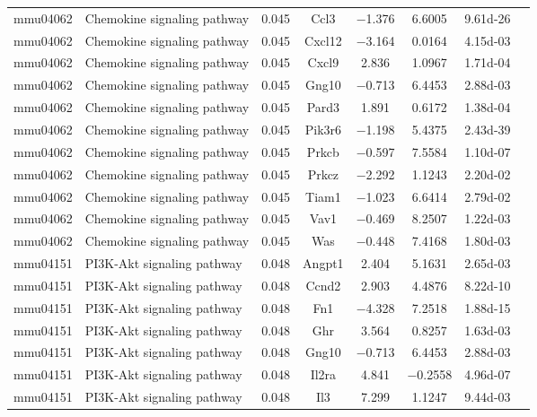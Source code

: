 {\begin{longtable}[l]{cp{4.3cm}cccccc}
mmu04062	& Chemokine signaling pathway	& \num{0.045}	& Ccl3	& \num{-1.376}	& \num{ 6.6005}	& \num{9.61d-26}\\ 
mmu04062	& Chemokine signaling pathway	& \num{0.045}	& Cxcl12	& \num{-3.164}	& \num{ 0.0164}	& \num{4.15d-03}\\ 
mmu04062	& Chemokine signaling pathway	& \num{0.045}	& Cxcl9	& \num{ 2.836}	& \num{ 1.0967}	& \num{1.71d-04}\\ 
mmu04062	& Chemokine signaling pathway	& \num{0.045}	& Gng10	& \num{-0.713}	& \num{ 6.4453}	& \num{2.88d-03}\\ 
mmu04062	& Chemokine signaling pathway	& \num{0.045}	& Pard3	& \num{ 1.891}	& \num{ 0.6172}	& \num{1.38d-04}\\ 
mmu04062	& Chemokine signaling pathway	& \num{0.045}	& Pik3r6	& \num{-1.198}	& \num{ 5.4375}	& \num{2.43d-39}\\ 
mmu04062	& Chemokine signaling pathway	& \num{0.045}	& Prkcb	& \num{-0.597}	& \num{ 7.5584}	& \num{1.10d-07}\\ 
mmu04062	& Chemokine signaling pathway	& \num{0.045}	& Prkcz	& \num{-2.292}	& \num{ 1.1243}	& \num{2.20d-02}\\ 
mmu04062	& Chemokine signaling pathway	& \num{0.045}	& Tiam1	& \num{-1.023}	& \num{ 6.6414}	& \num{2.79d-02}\\ 
mmu04062	& Chemokine signaling pathway	& \num{0.045}	& Vav1	& \num{-0.469}	& \num{ 8.2507}	& \num{1.22d-03}\\ 
mmu04062	& Chemokine signaling pathway	& \num{0.045}	& Was	& \num{-0.448}	& \num{ 7.4168}	& \num{1.80d-03}\\ 
mmu04151	& PI3K-Akt signaling pathway	& \num{0.048}	& Angpt1	& \num{ 2.404}	& \num{ 5.1631}	& \num{2.65d-03}\\ 
mmu04151	& PI3K-Akt signaling pathway	& \num{0.048}	& Ccnd2	& \num{ 2.903}	& \num{ 4.4876}	& \num{8.22d-10}\\ 
mmu04151	& PI3K-Akt signaling pathway	& \num{0.048}	& Fn1	& \num{-4.328}	& \num{ 7.2518}	& \num{1.88d-15}\\ 
mmu04151	& PI3K-Akt signaling pathway	& \num{0.048}	& Ghr	& \num{ 3.564}	& \num{ 0.8257}	& \num{1.63d-03}\\ 
mmu04151	& PI3K-Akt signaling pathway	& \num{0.048}	& Gng10	& \num{-0.713}	& \num{ 6.4453}	& \num{2.88d-03}\\ 
mmu04151	& PI3K-Akt signaling pathway	& \num{0.048}	& Il2ra	& \num{ 4.841}	& \num{-0.2558}	& \num{4.96d-07}\\ 
mmu04151	& PI3K-Akt signaling pathway	& \num{0.048}	& Il3	& \num{ 7.299}	& \num{ 1.1247}	& \num{9.44d-03}\\ 

\end{longtable}}
